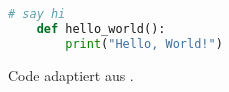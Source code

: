 \begin{lstlisting}[language=python]
    # say hi
    def hello_world():
        print("Hello, World!")
\end{lstlisting}

Code adaptiert aus \cite[80]{DemoQuelle}.%